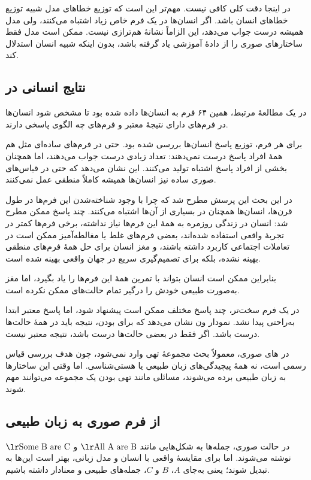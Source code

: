 در اینجا دقت کلی کافی نیست. مهم‌تر این است که توزیع خطاهای مدل شبیه توزیع خطاهای انسان باشد. اگر انسان‌ها در یک فرم خاص زیاد اشتباه می‌کنند، ولی مدل همیشه درست جواب می‌دهد، این الزاماً نشانهٔ هم‌ترازی نیست. ممکن است مدل فقط ساختارهای صوری را از دادهٔ آموزشی یاد گرفته باشد، بدون اینکه شبیه انسان استدلال کند.

\subsection{نتایج انسانی در }
در یک مطالعهٔ مرتبط، همین ۶۴ فرم  به انسان‌ها داده شده بود تا مشخص شود انسان‌ها در فرم‌های دارای نتیجهٔ معتبر و فرم‌های  چه الگوی پاسخی دارند.


برای هر فرم، توزیع پاسخ انسان‌ها بررسی شده بود. حتی در فرم‌های ساده‌ای مثل  هم همهٔ افراد پاسخ درست نمی‌دهند: تعداد زیادی درست جواب می‌دهند، اما همچنان بخشی از افراد پاسخ اشتباه تولید می‌کنند. این نشان می‌دهد که حتی در قیاس‌های صوری ساده نیز انسان‌ها همیشه کاملاً منطقی عمل نمی‌کنند.

در این بحث این پرسش مطرح شد که چرا با وجود شناخته‌شدن این فرم‌ها در طول قرن‌ها، انسان‌ها همچنان در بسیاری از آن‌ها اشتباه می‌کنند. چند پاسخ ممکن مطرح شد: انسان در زندگی روزمره به همهٔ این فرم‌ها نیاز نداشته، برخی فرم‌ها کمتر در تجربهٔ واقعی استفاده شده‌اند، بعضی فرم‌های غلط یا مغالطه‌آمیز ممکن است در تعاملات اجتماعی کاربرد داشته باشند، و مغز انسان برای حل همهٔ فرم‌های منطقی بهینه نشده، بلکه برای تصمیم‌گیری سریع در جهان واقعی بهینه شده است.

بنابراین ممکن است انسان بتواند با تمرین همهٔ این فرم‌ها را یاد بگیرد، اما مغز به‌صورت طبیعی خودش را درگیر تمام حالت‌های ممکن نکرده است.

در یک فرم سخت‌تر، چند پاسخ مختلف ممکن است پیشنهاد شود، اما پاسخ معتبر ابتدا به‌راحتی پیدا نشد. نمودار ون نشان می‌دهد که برای  بودن، نتیجه باید در همهٔ حالت‌ها درست باشد. اگر فقط در بعضی حالت‌ها درست باشد، نتیجه معتبر نیست.

در های صوری، معمولاً بحث مجموعهٔ تهی وارد نمی‌شود، چون هدف بررسی قیاس رسمی است، نه همهٔ پیچیدگی‌های زبان طبیعی یا هستی‌شناسی. اما وقتی این ساختارها به زبان طبیعی برده می‌شوند، مسائلی مانند تهی بودن یک مجموعه می‌توانند مهم شوند.

\subsection{از فرم صوری به زبان طبیعی}
در حالت صوری، جمله‌ها به شکل‌هایی مانند \(\text{\eng{All A are B}}\) و \(\text{\eng{Some B are C}}\) نوشته می‌شوند. اما برای مقایسهٔ واقعی با انسان و مدل زبانی، بهتر است این‌ها به  تبدیل شوند؛ یعنی به‌جای \(A\)، \(B\) و \(C\)، جمله‌های طبیعی و معنادار داشته باشیم.

